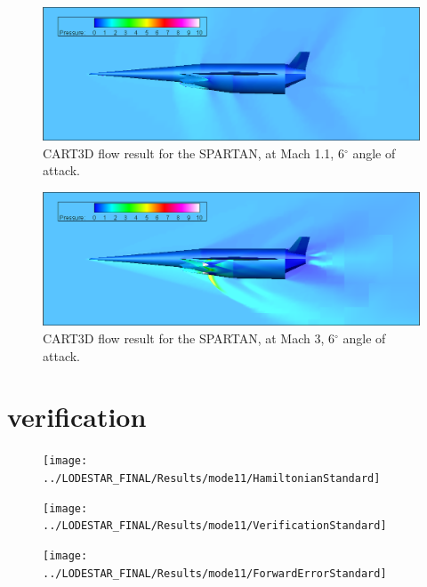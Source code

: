 		
		
		\begin{figure}
			\centering
			\includegraphics[width=0.9\linewidth]{figures/3_vehicle_design/M1p1AoA6}
			\caption{CART3D flow result for the SPARTAN, at Mach 1.1, 6$^\circ$ angle of attack.}
			\label{fig:M1}
		\end{figure}
		\begin{figure}
			\centering
			\includegraphics[width=0.9\linewidth]{figures/3_vehicle_design/M3AoA6}
			\caption{CART3D flow result for the SPARTAN, at Mach 3, 6$^\circ$ angle of attack.}
			\label{fig:M3AoA6}
		\end{figure}
		
		
		
		\section{verification}
		\begin{figure}
			\centering
			\texttt{[image: ../LODESTAR\_FINAL/Results/mode11/HamiltonianStandard]}
			\caption{}
			\label{fig:HamiltonianStandard}
		\end{figure}
		
		\begin{figure}
			\centering
			\texttt{[image: ../LODESTAR\_FINAL/Results/mode11/VerificationStandard]}
			\caption{}
			\label{fig:VerificationStandard}
		\end{figure}
		
		\begin{figure}
			\centering
			\texttt{[image: ../LODESTAR\_FINAL/Results/mode11/ForwardErrorStandard]}
			\caption{}
			\label{fig:ForwardErrorStandard}
		\end{figure}
		
